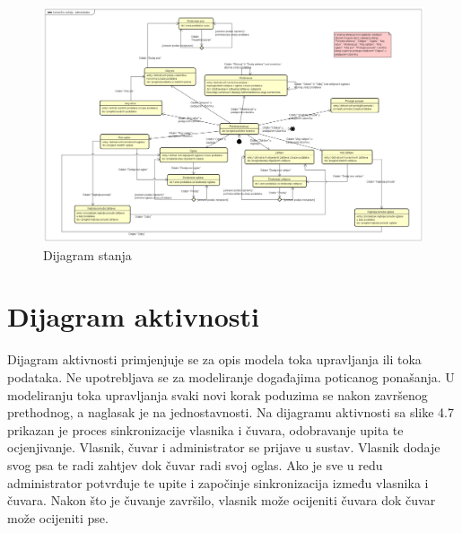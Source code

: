 			
			\begin{figure}[htb]
				\centering
				\includegraphics[width=15cm]{slike/Dijagram stanja}
				\caption{Dijagram stanja}
				\label{fig:Class-Diagram}
			\end{figure}
			
			\eject 
		
		\section{Dijagram aktivnosti}
			
			Dijagram aktivnosti primjenjuje se za opis modela toka upravljanja ili toka podataka. Ne upotrebljava se za modeliranje događajima poticanog ponašanja. U
			modeliranju toka upravljanja svaki novi korak poduzima se nakon završenog prethodnog, a naglasak je na jednostavnosti. Na dijagramu aktivnosti sa slike 4.7 prikazan je proces sinkronizacije vlasnika i čuvara, odobravanje upita te ocjenjivanje. Vlasnik, čuvar i administrator se prijave u sustav. Vlasnik dodaje svog psa te radi zahtjev dok čuvar radi svoj oglas.
			Ako je sve u redu administrator potvrđuje te upite i započinje sinkronizacija između vlasnika i čuvara. Nakon što je čuvanje završilo, vlasnik može ocijeniti čuvara dok čuvar može ocijeniti pse.
			
			\newpage
			
